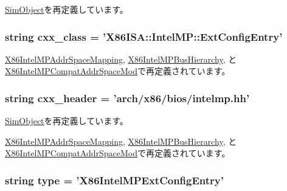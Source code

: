 \hyperlink{classm5_1_1SimObject_1_1SimObject_a17fa61ac3806b481cafee5593b55e5d0}{SimObject}を再定義しています。\hypertarget{classIntelMP_1_1X86IntelMPExtConfigEntry_a58cd55cd4023648e138237cfc0822ae3}{
\subsubsection[{cxx\_\-class}]{\setlength{\rightskip}{0pt plus 5cm}string {\bf cxx\_\-class} = '{\bf X86ISA::IntelMP::ExtConfigEntry}'}}
\label{classIntelMP_1_1X86IntelMPExtConfigEntry_a58cd55cd4023648e138237cfc0822ae3}


\hyperlink{classIntelMP_1_1X86IntelMPAddrSpaceMapping_a58cd55cd4023648e138237cfc0822ae3}{X86IntelMPAddrSpaceMapping}, \hyperlink{classIntelMP_1_1X86IntelMPBusHierarchy_a58cd55cd4023648e138237cfc0822ae3}{X86IntelMPBusHierarchy}, と \hyperlink{classIntelMP_1_1X86IntelMPCompatAddrSpaceMod_a58cd55cd4023648e138237cfc0822ae3}{X86IntelMPCompatAddrSpaceMod}で再定義されています。\hypertarget{classIntelMP_1_1X86IntelMPExtConfigEntry_a17da7064bc5c518791f0c891eff05fda}{
\subsubsection[{cxx\_\-header}]{\setlength{\rightskip}{0pt plus 5cm}string {\bf cxx\_\-header} = 'arch/x86/bios/intelmp.hh'}}
\label{classIntelMP_1_1X86IntelMPExtConfigEntry_a17da7064bc5c518791f0c891eff05fda}


\hyperlink{classm5_1_1SimObject_1_1SimObject_a17da7064bc5c518791f0c891eff05fda}{SimObject}を再定義しています。

\hyperlink{classIntelMP_1_1X86IntelMPAddrSpaceMapping_a17da7064bc5c518791f0c891eff05fda}{X86IntelMPAddrSpaceMapping}, \hyperlink{classIntelMP_1_1X86IntelMPBusHierarchy_a17da7064bc5c518791f0c891eff05fda}{X86IntelMPBusHierarchy}, と \hyperlink{classIntelMP_1_1X86IntelMPCompatAddrSpaceMod_a17da7064bc5c518791f0c891eff05fda}{X86IntelMPCompatAddrSpaceMod}で再定義されています。\hypertarget{classIntelMP_1_1X86IntelMPExtConfigEntry_acce15679d830831b0bbe8ebc2a60b2ca}{
\subsubsection[{type}]{\setlength{\rightskip}{0pt plus 5cm}string {\bf type} = '{\bf X86IntelMPExtConfigEntry}'}}
\label{classIntelMP_1_1X86IntelMPExtConfigEntry_acce15679d830831b0bbe8ebc2a60b2ca}


